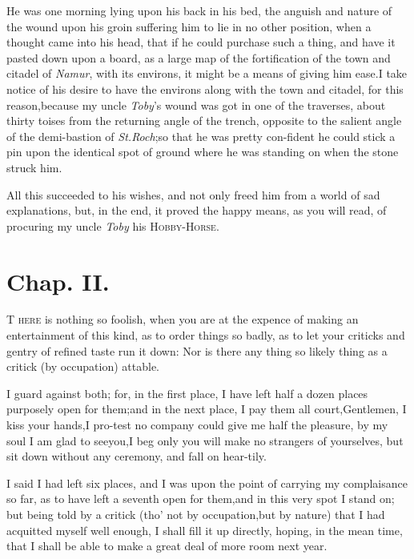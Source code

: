 \documentclass{article}
\begin{document}
He was one morning lying upon his back in his bed, the anguish and nature\break
of the wound upon his groin suffering him to lie in no other position, when a
thought came into his head, that if he could purchase such a thing, and have it
pasted down upon a board, as a large map of the fortification of the town and
citadel of \textit{Namur}, with its environs, it might be a means of giving him
ease.\tsk\break I take notice of his desire to have the environs along with the
town and cita\-del, for this reason,\tsk because my uncle \textit{Toby}’s
wound was got in one of the traverses, about thirty toises from the returning
angle of the trench, opposite to the salient angle of the demi-bastion of
\textit{St.\@ Roch};\tsh so that he was pretty con-\pb fident he could stick a
pin upon the identical spot of ground where he was standing on when the stone
struck him.


All this succeeded to his wishes, and not only freed him from a
world of sad explanations, but, in the end, it proved the happy means, as you will read, of procuring my
uncle \textit{Toby} his \textsc{Hobby-}\break\textsc{Horse}.


\section{Chap. II.}

\lettrine{T}{ here} is nothing so foolish, when you
are at the expence of making an entertainment of this kind, as to
order things so badly, as to let your criticks and gentry of
refined taste run it down: Nor is there any thing so likely\pb
{}
thing as a critick (by occupation) at\break table.

\tsh I guard against both; for, in the first place, I have left
half a dozen places purposely open for them;\tsk and in the next
place, I pay them all court,\tsk\break Gentlemen, I kiss your
hands,\tsh I pro-\break test no company could give me half the pleasure,\tsk
by my soul I am glad to see\break you,\tsh I beg only you will make no
strangers of yourselves, but sit down without any ceremony, and
fall on hear-\break tily.

\newpage
I said I had left six places, and I was upon the point of
carrying my complaisance so far, as to have left a seventh open for
them,\tsk and in this very spot I stand on; but being told by a
critick (tho’ not by occupation,\tsk but by nature) that I
had acquitted myself well enough, I shall fill it up directly,
hoping, in the mean time, that I shall be able to make a great deal
of more room next year.
\end{document}
